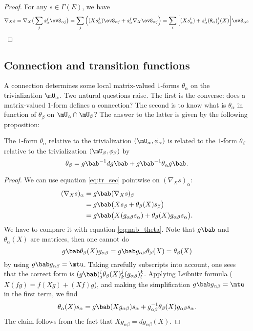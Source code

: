 \begin{proof}
	For any $s\in\Gamma(E)$, we have
	\begin{equation}
		\nabla_Xs=\nabla_X\big(  \sum_j s^j_{\alpha}\ovS_{\alpha j}  \big)
		=\sum_j\Big(  (Xs_{\alpha}^j)\ovS_{\alpha j} + s^j_{\alpha}\nabla_X\ovS_{\alpha j}     \Big)
		=\sum_i\Big[   (Xs_{\alpha}^i)+s_{\alpha}^j(\theta_{\alpha})_j^i(X)  \Big]\ovS_{\alpha i}.
	\end{equation}
\end{proof}

\subsection{Connection and transition functions}

A connection determines some local matrix-valued $1$-forms $\theta_{\alpha}$ on the trivialization $\mU_{\alpha}$. Two natural questions raise. The first is the converse: does a matrix-valued $1$-form defines a connection? The second is to know  what is $\theta_{\alpha}$ in function of $\theta_{\beta}$ on $\mU_{\alpha}\cap\mU_{\beta}$? The answer to the latter is  given by the following proposition:

\begin{proposition}
	The $1$-form $\theta_{\alpha}$ relative to the trivialization $(\mU_{\alpha},\phi_{\alpha})$ is related to the $1$-form $\theta_{\beta}$ relative to the trivialization $(\mU_{\beta},\phi_{\beta})$ by
	\begin{equation}\label{eq:theta_g}
		\theta_{\beta}=g\bab^{-1} dg\bab+g\bab^{-1}\theta_{\alpha} g\bab.
	\end{equation}
\end{proposition}

\begin{proof}
	We can use equation \eqref{eq:tr_sec} pointwise on $(\nabla_X s)_{\alpha}$:
	\begin{equation}
		\begin{split}
			(\nabla_X s)_{\alpha}&=g\bab(\nabla_Xs)_{\beta}\\
			&=g\bab\big(   Xs_{\beta}+\theta_{\beta}(X)s_{\beta}   \big) \\
			&=g\bab\big(   X(g_{\alpha\beta} s_{\alpha})+\theta_{\beta}(X)g_{\alpha\beta} s_{\alpha}   \big).
		\end{split}
	\end{equation}
	We have to compare it with equation \eqref{eq:nab_theta}. Note that $g\bab$ and $\theta_{\alpha}(X)$ are matrices, then one cannot do
	\[
		g\bab\theta_{\beta}(X)g_{\alpha\beta} =g\bab g_{\alpha\beta}\theta_{\beta}(X)=\theta_{\beta}(X)
	\]
	by using $g\bab g_{\alpha\beta}=\mtu$.  Taking carefully subscripts into account, one sees that the correct form is $(g\bab)^i_j\theta_{\beta}(X)^j_k(g_{\alpha\beta})^k_l$. Applying Leibnitz formula ($X(fg)=f(Xg)+(Xf)g$), and making the simplification $g\bab g_{\alpha\beta}=\mtu$ in the first term, we find
	\[
		\theta_{\alpha}(X)s_{\alpha}=g\bab(Xg_{\alpha\beta})s_{\alpha}+g_{\alpha\beta}^{-1}\theta_{\beta}(X)g_{\alpha\beta} s_{\alpha}.
	\]
	The claim follows from the fact that $Xg_{\alpha\beta}=dg_{\alpha\beta}(X)$.
\end{proof}


